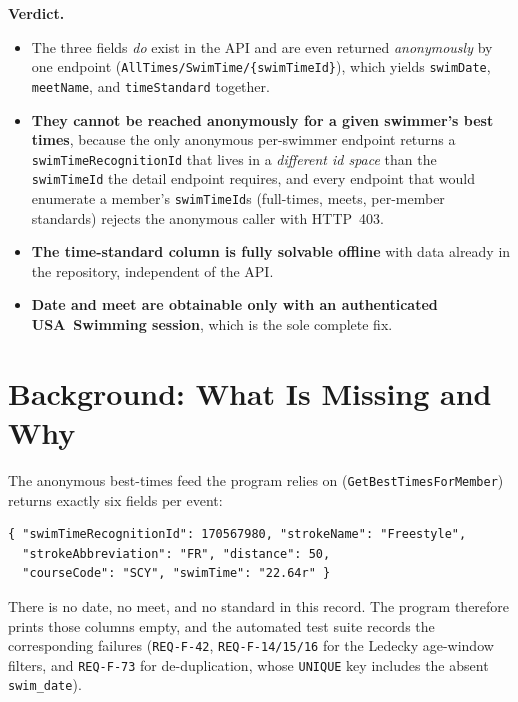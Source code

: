\documentclass[12pt]{article}
\newcommand{\code}[1]{\texttt{#1}}
\begin{document}
\medskip
\noindent\textbf{Verdict.}
\begin{itemize}[leftmargin=1.4em]
  \item The three fields \emph{do} exist in the API and are even returned
        \emph{anonymously} by one endpoint
        (\code{AllTimes/SwimTime/\{swimTimeId\}}), which yields
        \code{swimDate}, \code{meetName}, and \code{timeStandard} together.
  \item \textbf{They cannot be reached anonymously for a given swimmer's
        best times}, because the only anonymous per-swimmer endpoint returns
        a \code{swimTimeRecognitionId} that lives in a \emph{different id
        space} than the \code{swimTimeId} the detail endpoint requires, and
        every endpoint that would enumerate a member's \code{swimTimeId}s
        (full-times, meets, per-member standards) rejects the anonymous
        caller with HTTP~403.
  \item \textbf{The time-standard column is fully solvable offline} with data
        already in the repository, independent of the API.
  \item \textbf{Date and meet are obtainable only with an authenticated
        USA~Swimming session}, which is the sole complete fix.
\end{itemize}

\section{Background: What Is Missing and Why}

The anonymous best-times feed the program relies on
(\code{GetBestTimesForMember}) returns exactly six fields per event:

\begin{lstlisting}
{ "swimTimeRecognitionId": 170567980, "strokeName": "Freestyle",
  "strokeAbbreviation": "FR", "distance": 50,
  "courseCode": "SCY", "swimTime": "22.64r" }
\end{lstlisting}

There is no date, no meet, and no standard in this record. The program
therefore prints those columns empty, and the automated test suite records
the corresponding failures (\code{REQ-F-42}, \code{REQ-F-14/15/16} for the
Ledecky age-window filters, and \code{REQ-F-73} for de-duplication, whose
\code{UNIQUE} key includes the absent \code{swim\_date}).
\end{document}
